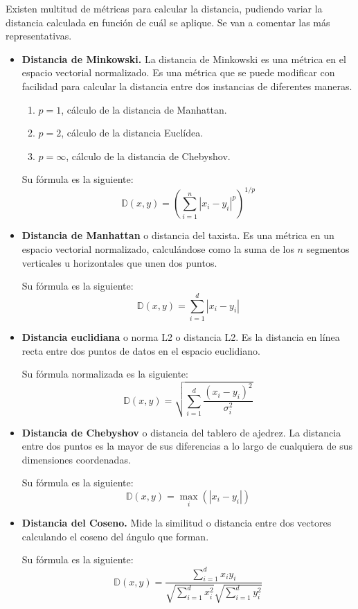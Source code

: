 Existen multitud de métricas para calcular la distancia, pudiendo variar la distancia calculada en función de cuál se aplique. Se van a comentar las más representativas.
\begin{itemize}
\item \textbf{Distancia de Minkowski.} La distancia de Minkowski es una métrica en el espacio vectorial normalizado. Es una métrica que se puede modificar con facilidad para calcular la distancia entre dos instancias de diferentes maneras. 
\begin{enumerate}
\item \(p = 1\), cálculo de la distancia de Manhattan.
\item \(p = 2\), cálculo de la distancia Euclídea.
\item \(p = \infty\), cálculo de la distancia de Chebyshov.
\end{enumerate}
Su fórmula es la siguiente:
\[ \mathbb{D}(x, y) = \left( \sum_{i=1}^{n}\left| x_i - y_i \right|^p \right)^{1/p} \]

\item \textbf{Distancia de Manhattan} o distancia del taxista. Es una métrica en un espacio vectorial normalizado, calculándose como la suma de los $n$ segmentos verticales u horizontales que unen dos puntos.

Su fórmula es la siguiente:
\[  \mathbb{D}(x, y) = \sum_{i=1}^{d}\left| x_i - y_i\right| \]

\item \textbf{Distancia euclidiana} o norma L2 o distancia L2. Es la distancia en línea recta entre dos puntos de datos en el espacio euclidiano.

Su fórmula normalizada es la siguiente:
\[  \mathbb{D}(x, y) = \sqrt{\sum_{i=1}^{d} \frac{\left(x_i - y_i\right)^2}{\sigma_i^2}}  \]

\item \textbf{Distancia de Chebyshov} o distancia del tablero de ajedrez. La distancia entre dos puntos es la mayor de sus diferencias a lo largo de cualquiera de sus dimensiones coordenadas.

Su fórmula es la siguiente:
\[  \mathbb{D}(x, y) = \max_i\left(\left|x_i - y_i\right|\right) \]

\item \textbf{Distancia del Coseno.} Mide la similitud o distancia entre dos vectores calculando el coseno del ángulo que forman.

Su fórmula es la siguiente:
\[ \mathbb{D}(x, y) = \frac{\sum_{i=1}^{d}x_iy_i}{\sqrt{\sum_{i=1}^{d}x_i^2}\sqrt{\sum_{i=1}^{d}y_i^2} } \]

\end{itemize}
\newpage
